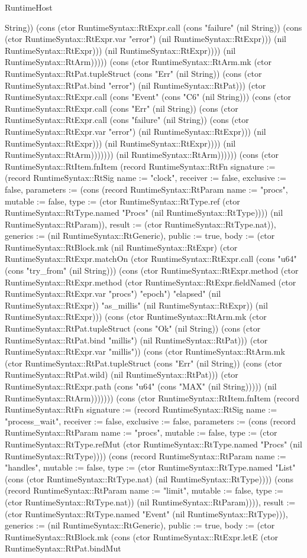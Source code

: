 \begin{lexlean}{RuntimeHost}
\begin{semanticmodule}
{String)) (cons (ctor RuntimeSyntax::RtExpr.call (cons "failure" (nil String)) (cons (ctor RuntimeSyntax::RtExpr.var "error") (nil RuntimeSyntax::RtExpr))) (nil RuntimeSyntax::RtExpr))) (nil RuntimeSyntax::RtExpr)))) (nil RuntimeSyntax::RtArm))))) (cons (ctor RuntimeSyntax::RtArm.mk (ctor RuntimeSyntax::RtPat.tupleStruct (cons "Err" (nil String)) (cons (ctor RuntimeSyntax::RtPat.bind "error") (nil RuntimeSyntax::RtPat))) (ctor RuntimeSyntax::RtExpr.call (cons "Event" (cons "C6" (nil String))) (cons (ctor RuntimeSyntax::RtExpr.call (cons "Err" (nil String)) (cons (ctor RuntimeSyntax::RtExpr.call (cons "failure" (nil String)) (cons (ctor RuntimeSyntax::RtExpr.var "error") (nil RuntimeSyntax::RtExpr))) (nil RuntimeSyntax::RtExpr))) (nil RuntimeSyntax::RtExpr)))) (nil RuntimeSyntax::RtArm))))))) (nil RuntimeSyntax::RtArm))))})) (cons (ctor RuntimeSyntax::RtItem.fnItem (record RuntimeSyntax::RtFn {signature := (record RuntimeSyntax::RtSig {name := "clock", receiver := false, exclusive := false, parameters := (cons (record RuntimeSyntax::RtParam {name := "procs", mutable := false, type := (ctor RuntimeSyntax::RtType.ref (ctor RuntimeSyntax::RtType.named "Procs" (nil RuntimeSyntax::RtType)))}) (nil RuntimeSyntax::RtParam)), result := (ctor RuntimeSyntax::RtType.nat)}), generics := (nil RuntimeSyntax::RtGeneric), public := true, body := (ctor RuntimeSyntax::RtBlock.mk (nil RuntimeSyntax::RtExpr) (ctor RuntimeSyntax::RtExpr.matchOn (ctor RuntimeSyntax::RtExpr.call (cons "u64" (cons "try_from" (nil String))) (cons (ctor RuntimeSyntax::RtExpr.method (ctor RuntimeSyntax::RtExpr.method (ctor RuntimeSyntax::RtExpr.fieldNamed (ctor RuntimeSyntax::RtExpr.var "procs") "epoch") "elapsed" (nil RuntimeSyntax::RtExpr)) "as_millis" (nil RuntimeSyntax::RtExpr)) (nil RuntimeSyntax::RtExpr))) (cons (ctor RuntimeSyntax::RtArm.mk (ctor RuntimeSyntax::RtPat.tupleStruct (cons "Ok" (nil String)) (cons (ctor RuntimeSyntax::RtPat.bind "millis") (nil RuntimeSyntax::RtPat))) (ctor RuntimeSyntax::RtExpr.var "millis")) (cons (ctor RuntimeSyntax::RtArm.mk (ctor RuntimeSyntax::RtPat.tupleStruct (cons "Err" (nil String)) (cons (ctor RuntimeSyntax::RtPat.wild) (nil RuntimeSyntax::RtPat))) (ctor RuntimeSyntax::RtExpr.path (cons "u64" (cons "MAX" (nil String))))) (nil RuntimeSyntax::RtArm)))))})) (cons (ctor RuntimeSyntax::RtItem.fnItem (record RuntimeSyntax::RtFn {signature := (record RuntimeSyntax::RtSig {name := "process_wait", receiver := false, exclusive := false, parameters := (cons (record RuntimeSyntax::RtParam {name := "procs", mutable := false, type := (ctor RuntimeSyntax::RtType.refMut (ctor RuntimeSyntax::RtType.named "Procs" (nil RuntimeSyntax::RtType)))}) (cons (record RuntimeSyntax::RtParam {name := "handles", mutable := false, type := (ctor RuntimeSyntax::RtType.named "List" (cons (ctor RuntimeSyntax::RtType.nat) (nil RuntimeSyntax::RtType)))}) (cons (record RuntimeSyntax::RtParam {name := "limit", mutable := false, type := (ctor RuntimeSyntax::RtType.nat)}) (nil RuntimeSyntax::RtParam)))), result := (ctor RuntimeSyntax::RtType.named "Event" (nil RuntimeSyntax::RtType))}), generics := (nil RuntimeSyntax::RtGeneric), public := true, body := (ctor RuntimeSyntax::RtBlock.mk (cons (ctor RuntimeSyntax::RtExpr.letE (ctor RuntimeSyntax::RtPat.bindMut }
\end{semanticmodule}
\end{lexlean}
